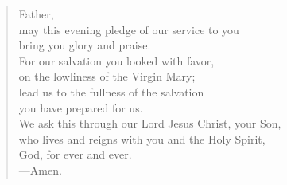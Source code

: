 \prayer

\setlength{\vleftmargin}{\prayerleftmargini}

\begin{verse}
Father,\\
may this evening pledge of our service to you\\
bring you glory and praise.\\
For our salvation you looked with favor,\\
on the lowliness of the Virgin Mary;\\
lead us to the fullness of the salvation\\
you have prepared for us.\\
We ask this through our Lord Jesus Christ, your Son,\\
who lives and reigns with you and the Holy Spirit,\\
God, for ever and ever.\\
{\color{red}---\thinspace}Amen.
\end{verse}

\setlength{\vleftmargin}{\defleftmargini}